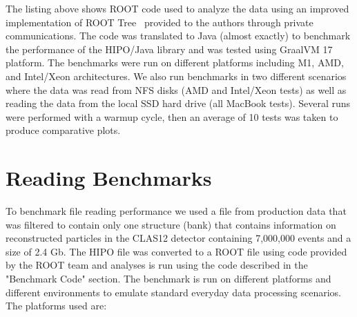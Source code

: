 \documentclass[preprint,12pt]{elsarticle}
\begin{document}

The listing above shows ROOT code used to analyze the data using an improved implementation of 
ROOT Tree~\cite{Blomer:2020usr} provided to the authors through private communications.
The code was translated to Java (almost exactly) to benchmark the performance of the HIPO/Java library and
was tested using GraalVM 17 platform.
The benchmarks were run on different platforms including M1, AMD, and Intel/Xeon architectures.
We also run benchmarks in two different scenarios where the data was read from NFS disks (AMD and Intel/Xeon tests)
as well as reading the data from the local SSD hard drive (all MacBook tests). Several runs were performed with a warmup cycle,
then an average of 10 tests was taken to produce comparative plots.


\section{Reading Benchmarks}
\indent

To benchmark file reading performance we used a file from production data that was filtered to contain
only one structure (bank) that contains information on reconstructed particles in the CLAS12 detector
containing 7,000,000 events and a size of 2.4 Gb. The HIPO file was converted to a ROOT file using 
code provided by the ROOT team and analyses is run using the code described in the "Benchmark Code" section.
The benchmark is run on different platforms and different environments to emulate standard everyday data 
processing scenarios. The platforms used are:
\end{document}
